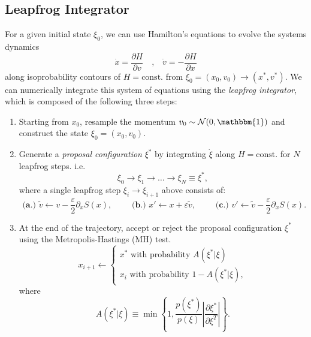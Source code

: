 \documentclass[a4paper,11pt]{article}
\begin{document}
\subsection{\label{subsec:lfint}Leapfrog Integrator}
%
For a given initial state \(\xi_{0}\), we can use Hamilton's equations to
evolve the systems dynamics 
%
\begin{equation}
    \dot{x} = \frac{\partial H}{\partial v}\quad \text{,} \quad \dot{v} = -\frac{\partial H}{\partial x}
\end{equation}
%
along isoprobability contours of \(H =\text{const.}\) from \(\xi_{0} = (x_{0},
v_{0})\rightarrow (x^{\ast}, v^{\ast})\).
%
We can numerically integrate this system of equations using the \emph{leapfrog
integrator}, which is composed of the following three steps:
%
\begin{enumerate}
    \item Starting from \(x_{0}\), resample the momentum \(v_{0}\sim
        \mathcal{N}(0, \mathbbm{1})\) and construct the state \(\xi_{0} =
        (x_{0}, v_{0})\).
    \item Generate a \emph{proposal configuration} \(\xi^{\ast}\) by
        integrating \(\dot\xi\) along \(H = \mathrm{const.}\)
        for \(N\) leapfrog steps.
        i.e.
        \begin{equation}
            \xi_{0}\rightarrow \xi_{1}\rightarrow\ldots\rightarrow%
            \xi_{N} \equiv \xi^{\ast},
        \end{equation}
        where a single leapfrog step \(\xi_{i} \rightarrow \xi_{i+1}\) above
        consists of: 
        \begin{equation}
            \textbf{ (a.) }%
              \tilde{v}\leftarrow v - \frac{\varepsilon}{2}\partial_{x} S(x),
            \quad\quad
            \textbf{ (b.) }%
              x' \leftarrow x + \varepsilon \tilde{v},
            \quad\quad
            \textbf{ (c.) }%
              v' \leftarrow \tilde{v} - \frac{\varepsilon}{2}\partial_{x} S(x).
        \end{equation}
    \item At the end of the trajectory, accept or reject the proposal
        configuration \(\xi^{\ast}\) using the Metropolis-Hastings (MH) test.
        \begin{equation}
            x_{i+1} \leftarrow
            \begin{cases}
                x^{\ast}\text{ with probability } A(\xi^{\ast}|\xi)\\
                x_{i}\text{ with probability } 1 - A(\xi^{\ast}|\xi),
            \end{cases}
        \end{equation}
        where
        \begin{equation}
            A(\xi^{\ast}|\xi) \equiv \min\left\{1, \frac{p(\xi^{\ast})}{p(\xi)}\left|\frac{\partial \xi^{\ast}}{\partial \xi^{T}}\right|\right\}.
        \end{equation}
\end{enumerate}
\end{document}
